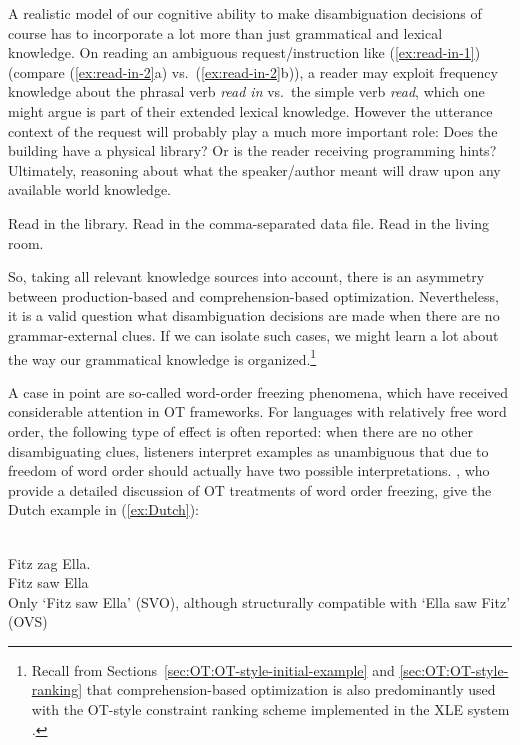 \documentclass[output=paper,hidelinks]{langscibook}
\begin{document}
A realistic model of our cognitive ability to make disambiguation decisions of course has to incorporate a lot more than just grammatical and lexical knowledge. On reading an ambiguous request/instruction like (\ref{ex:read-in-1}) (compare (\ref{ex:read-in-2}a) vs.\ (\ref{ex:read-in-2}b)), a reader may exploit frequency knowledge about the phrasal verb \emph{read in} vs.\ the simple verb \emph{read}, which one might argue is part of their extended lexical knowledge. However the utterance context of the request will probably play a much more important role: Does the building have a physical library? Or is the reader receiving programming hints? Ultimately, reasoning about what the speaker/author meant will draw upon any available world knowledge.


\ea \label{ex:read-in-1}
Read in the library.
\ex \label{ex:read-in-2}
\ea Read in the comma-separated data file.
\ex Read in the living room.
\z
\z

So, taking all relevant knowledge sources into account, there is an asymmetry between production-based and comprehension-based optimization. Nevertheless, it is a valid question what disambiguation decisions are made when there are no grammar-external clues. If we can isolate such cases, we might learn a lot about the way our grammatical knowledge is organized.\footnote{Recall from Sections~\ref{sec:OT:OT-style-initial-example} and \ref{sec:OT:OT-style-ranking} that comprehension-based optimization is also predominantly used with the OT-style constraint ranking scheme implemented in the XLE system \citep{franketal01}.}

A case in point are so-called word-order freezing phenomena, which have received considerable attention in OT frameworks. For languages with relatively free word order, the following type of effect is often reported: when there are no other disambiguating clues, listeners interpret examples as unambiguous that due to freedom of word order should actually have two possible interpretations. \citet{BoumaHendriks2012}, who provide a detailed discussion of OT treatments of word order freezing, give the Dutch example in (\ref{ex:Dutch}):

\ea \label{ex:Dutch}
\\
  \gll Fitz zag Ella. \\
  Fitz saw Ella  \\
\glt Only `Fitz saw Ella' (SVO),
although structurally compatible with `Ella saw Fitz' (OVS)
\z
\end{document}
